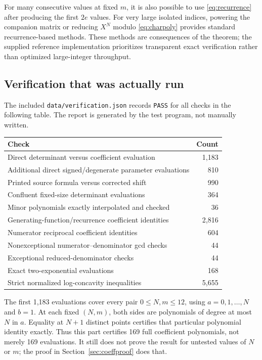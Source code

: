 \documentclass[11pt,a4paper]{article}
\numberwithin{equation}{section}
\theoremstyle{definition}
\theoremstyle{remark}
\begin{document}
For many consecutive values at fixed $m$, it is also possible to use
\eqref{eq:recurrence} after producing the first $2e$ values.  For very
large isolated indices, powering the companion matrix or reducing
$X^N$ modulo \eqref{eq:charpoly} provides standard recurrence-based
methods.  These methods are consequences of the theorem; the supplied
reference implementation prioritizes transparent exact verification
rather than optimized large-integer throughput.

\subsection{Verification that was actually run}
The included \texttt{data/verification.json} records \texttt{PASS} for
all checks in the following table.  The report is generated by the test
program, not manually written.
\begin{center}
\small
\renewcommand{\arraystretch}{1.17}
\begin{tabular}{@{}p{}r@{}}
\toprule
Check & Count\\
\midrule
Direct determinant versus coefficient evaluation & 1,183\\
Additional direct signed/degenerate parameter evaluations & 810\\
Printed source formula versus corrected shift & 990\\
Confluent fixed-size determinant evaluations & 364\\
Minor polynomials exactly interpolated and checked & 36\\
Generating-function/recurrence coefficient identities & 2,816\\
Numerator reciprocal coefficient identities & 604\\
Nonexceptional numerator--denominator gcd checks & 44\\
Exceptional reduced-denominator checks & 44\\
Exact two-exponential evaluations & 168\\
Strict normalized log-concavity inequalities & 5,655\\
\bottomrule
\end{tabular}
\end{center}

The first 1,183 evaluations cover every pair $0\leq N,m\leq12$,
using $a=0,1,\ldots,N$ and $b=1$.  At each fixed $(N,m)$, both sides
are polynomials of degree at most $N$ in $a$.  Equality at $N+1$
distinct points certifies that particular polynomial identity exactly.
Thus this part certifies 169 full coefficient polynomials, not merely
169 evaluations.  It still does not prove the result for untested
values of $N$ or $m$; the proof in Section~\ref{sec:coeffproof} does that.
\end{document}
